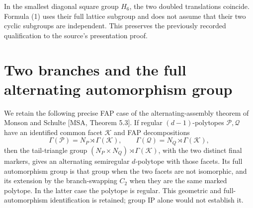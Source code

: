 In the smallest diagonal square group $H_6$, the two doubled translations
coincide. Formula (1) uses their full lattice subgroup and does not assume
that their two cyclic subgroups are independent. This preserves the
previously recorded qualification to the source's presentation proof.

\section{Two branches and the full alternating automorphism group}
We retain the following precise FAP case of the alternating-assembly theorem
of Monson and Schulte [MSA, Theorem 5.3]. If regular $(d-1)$-polytopes
$\mathcal P,\mathcal Q$ have an identified common facet $\mathcal K$ and
FAP decompositions
\[
 \Gamma(\mathcal P)=N_P\rtimes\Gamma(\mathcal K),\qquad
 \Gamma(\mathcal Q)=N_Q\rtimes\Gamma(\mathcal K),
\]
then the tail-triangle group
$(N_P\times N_Q)\rtimes\Gamma(\mathcal K)$, with the two distinct final
markers, gives an alternating semiregular $d$-polytope with those facets.
Its full automorphism group is that group when the two facets are not
isomorphic, and its extension by the branch-swapping $C_2$ when they are
the same marked polytope. In the latter case the polytope is regular.
This geometric and full-automorphism identification is retained; group IP
alone would not establish it.

